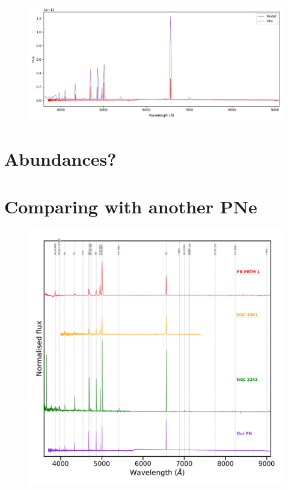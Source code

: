 \documentclass[twocolumn]{article}
\begin{document}
\begin{figure}
\centering
  \includegraphics[width=0.89\linewidth]{../Spectra-lamostdr7/DdDm1_L4_T130_output_SED-E02-comparing-spectra}
  \caption{} 
  \label{fig:spectra-obs-model}
\end{figure}

\section{Abundances?}
\label{sec:abun}

\section{Comparing with another PNe}
\label{sec:comp}

\begin{figure}
\centering
  \includegraphics[width=0.89\linewidth]{../Figs/spectra-compare.pdf}
  \caption{} 
  \label{fig:spectra-obs-model}
\end{figure}



\end{document}
